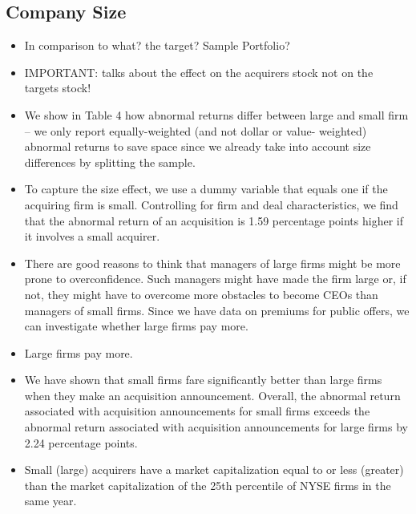 \documentclass[12pt]{article}
\begin{document}
\subsection{Company Size}

    \begin{itemize}

        \item In comparison to what? the target? Sample Portfolio? 
        \item IMPORTANT: \citet{Moeller2004} talks about the effect on the acquirers stock not on the targets stock! 
        \item We show in Table 4 how abnormal returns differ between large and small firm \citep{Moeller2004} -- we only report equally-weighted (and not dollar or value- weighted) abnormal returns to save space since we already take into account size differences by splitting the sample. 

        \item To capture the size effect, we use a dummy variable that equals one if the acquiring firm is small. Controlling for firm and deal characteristics, we find that the abnormal return of an acquisition is 1.59 percentage points higher if it involves a small acquirer. \citep{Moeller2004}

        \item There are good reasons to think that managers of large firms might be more prone to overconfidence. Such managers might have made the firm large or, if not, they might have to overcome more obstacles to become CEOs than managers of small firms. Since we have data on premiums for public offers, we can investigate whether large firms pay more. \citep{Moeller2004}

        \item Large firms pay more. \citep{Moeller2004}

        \item We have shown that small firms fare significantly better than large firms when they make an acquisition announcement. Overall, the abnormal return associated with acquisition announcements for small firms exceeds the abnormal return associated with acquisition announcements for large firms by 2.24 percentage points.\citep{Moeller2004}

        \item Small (large) acquirers have a market capitalization equal to or less (greater) than the market capitalization of the 25th percentile of NYSE firms in the same year. \citep{Moeller2004}


\end{itemize}
\end{document}
